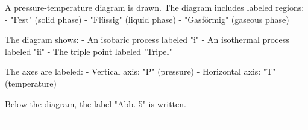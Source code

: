 A pressure-temperature diagram is drawn. The diagram includes labeled regions:  
- "Fest" (solid phase)  
- "Flüssig" (liquid phase)  
- "Gasförmig" (gaseous phase)  

The diagram shows:  
- An isobaric process labeled "i"  
- An isothermal process labeled "ii"  
- The triple point labeled "Tripel"  

The axes are labeled:  
- Vertical axis: "P" (pressure)  
- Horizontal axis: "T" (temperature)  

Below the diagram, the label "Abb. 5" is written.

---